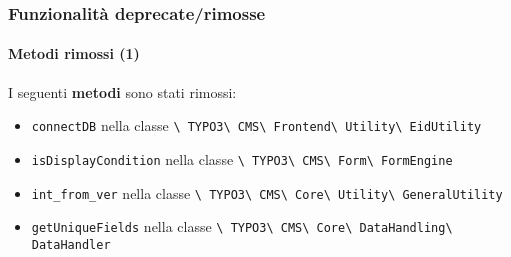 \begin{frame}[fragile]
	\frametitle{Funzionalità deprecate/rimosse}
	\framesubtitle{Metodi rimossi (1)}

	I seguenti \textbf{metodi} sono stati rimossi:

	\begin{itemize}
		\item
			\small
				\texttt{connectDB}\newline
				nella classe
				\texttt{\textbackslash
					TYPO3\textbackslash
					CMS\textbackslash
					Frontend\textbackslash
					Utility\textbackslash
					EidUtility}
			\normalsize
		\item
			\small
				\texttt{isDisplayCondition}\newline
				nella classe
				\texttt{\textbackslash
					TYPO3\textbackslash
					CMS\textbackslash
					Form\textbackslash
					FormEngine}
			\normalsize
		\item
			\small
				\texttt{int\_from\_ver}\newline
				nella classe
				\texttt{\textbackslash
					TYPO3\textbackslash
					CMS\textbackslash
					Core\textbackslash
					Utility\textbackslash
					GeneralUtility}
			\normalsize
		\item
			\small
				\texttt{getUniqueFields}\newline
				nella classe
				\texttt{\textbackslash
					TYPO3\textbackslash
					CMS\textbackslash
					Core\textbackslash
					DataHandling\textbackslash
					DataHandler}
			\normalsize

	\end{itemize}

\end{frame}


